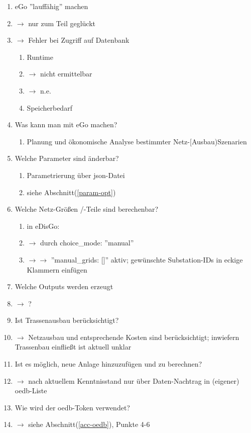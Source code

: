 \documentclass[
a4paper,     %
12pt         %
]{scrartcl}  %
\begin{document}
\begin{enumerate}
	\item eGo ''lauffähig'' machen
	\item[]$\rightarrow$ nur zum Teil geglückt
	\item[]$\rightarrow$ Fehler bei Zugriff auf Datenbank
	\begin{enumerate}
		\item Runtime
		\item[] $\rightarrow$ nicht ermittelbar
		\item[] $\rightarrow$ n.e.
		\item Speicherbedarf
	\end{enumerate}
	\item Was kann man mit eGo machen?
	\begin{enumerate}
		\item Planung und ökonomische Analyse bestimmter Netz-[Ausbau)Szenarien

	\end{enumerate}
	\item Welche Parameter sind änderbar?
	\begin{enumerate}
		\item Parametrierung über json-Datei
		\item siehe Abschnitt(\ref{param-opt})
	\end{enumerate}
	\item Welche Netz-Größen /-Teile sind berechenbar?
	\begin{enumerate}
		\item in eDisGo:
		\item[] $\rightarrow$ durch choice\_mode: ''manual''
		\item[] $\rightarrow \rightarrow$ ''manual\_grids: []'' aktiv; gewünschte Substation-IDs in eckige Klammern einfügen
	\end{enumerate}
	\item Welche Outputs werden erzeugt
	\item[] $\rightarrow$ ?

	\item Ist Trassenausbau berücksichtigt?
	\item[] $\rightarrow$ Netzausbau und entsprechende Kosten sind berücksichtigt; inwiefern Trassenbau einfließt ist aktuell unklar

	\item Ist es möglich, neue Anlage hinzuzufügen und zu berechnen?
	\item[] $\rightarrow$ nach aktuellem Kenntnisstand nur über Daten-Nachtrag in (eigener) oedb-Liste
	\item Wie wird der oedb-Token verwendet?
	\item[] $\rightarrow$ siehe Abschnitt(\ref{acc-oedb}), Punkte 4-6


\end{enumerate}
\end{document}
